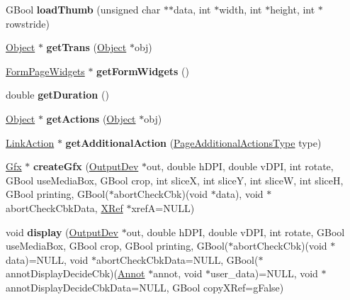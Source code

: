 \begin{DoxyCompactItemize}
\item 
\mbox{\label{class_page_a0a994854f2f03ee0f4b888118af023e0}} 
G\+Bool {\bfseries load\+Thumb} (unsigned char $\ast$$\ast$data, int $\ast$width, int $\ast$height, int $\ast$rowstride)
\item 
\mbox{\label{class_page_a11b0ed384f06ac7a99066afc58cc3cdc}} 
\hyperlink{class_object}{Object} $\ast$ {\bfseries get\+Trans} (\hyperlink{class_object}{Object} $\ast$obj)
\item 
\mbox{\label{class_page_a70b8429efc9194595a0bd8f583f3ec20}} 
\hyperlink{class_form_page_widgets}{Form\+Page\+Widgets} $\ast$ {\bfseries get\+Form\+Widgets} ()
\item 
\mbox{\label{class_page_afa3f5f958a86223c0e2b252feae8a185}} 
double {\bfseries get\+Duration} ()
\item 
\mbox{\label{class_page_a33dbbb8cb31d134f3a43bfccc4365455}} 
\hyperlink{class_object}{Object} $\ast$ {\bfseries get\+Actions} (\hyperlink{class_object}{Object} $\ast$obj)
\item 
\mbox{\label{class_page_a52f87ba7bab6d50673a88ae31a52fcfe}} 
\hyperlink{class_link_action}{Link\+Action} $\ast$ {\bfseries get\+Additional\+Action} (\hyperlink{class_page_a283db2a63b02abe61631781a057c4746}{Page\+Additional\+Actions\+Type} type)
\item 
\mbox{\label{class_page_ad9d7488d0ee34ee296c37be4a4a6a411}} 
\hyperlink{class_gfx}{Gfx} $\ast$ {\bfseries create\+Gfx} (\hyperlink{class_output_dev}{Output\+Dev} $\ast$out, double h\+D\+PI, double v\+D\+PI, int rotate, G\+Bool use\+Media\+Box, G\+Bool crop, int sliceX, int sliceY, int sliceW, int sliceH, G\+Bool printing, G\+Bool($\ast$abort\+Check\+Cbk)(void $\ast$data), void $\ast$abort\+Check\+Cbk\+Data, \hyperlink{class_x_ref}{X\+Ref} $\ast$xrefA=N\+U\+LL)
\item 
\mbox{\label{class_page_abe5d672dc7744950f62ee4624c84e7d6}} 
void {\bfseries display} (\hyperlink{class_output_dev}{Output\+Dev} $\ast$out, double h\+D\+PI, double v\+D\+PI, int rotate, G\+Bool use\+Media\+Box, G\+Bool crop, G\+Bool printing, G\+Bool($\ast$abort\+Check\+Cbk)(void $\ast$data)=N\+U\+LL, void $\ast$abort\+Check\+Cbk\+Data=N\+U\+LL, G\+Bool($\ast$annot\+Display\+Decide\+Cbk)(\hyperlink{class_annot}{Annot} $\ast$annot, void $\ast$user\+\_\+data)=N\+U\+LL, void $\ast$annot\+Display\+Decide\+Cbk\+Data=N\+U\+LL, G\+Bool copy\+X\+Ref=g\+False)
$$
\end{DoxyCompactItemize}
